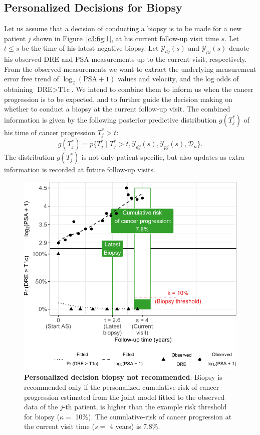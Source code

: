 \subsection{Personalized Decisions for Biopsy}
\label{c3:subsec:pers_decision_making}
Let us assume that a decision of conducting a biopsy is to be made for a new patient $j$ shown in Figure~\ref{c3:fig:1}, at his current follow-up visit time $s$. Let $t\leq s$ be the time of his latest negative biopsy. Let $\mathcal{Y}_{dj}(s)$ and $\mathcal{Y}_{pj}(s)$ denote his observed DRE and PSA measurements up to the current visit, respectively. From the observed measurements we want to extract the underlying measurement error free trend of $\log_2 (\mbox{PSA} + 1)$ values and velocity, and the log odds of obtaining $\mbox{DRE} > \mbox{T1c}$. We intend to combine them to inform us when the cancer progression is to be expected, and to further guide the decision making on whether to conduct a biopsy at the current follow-up visit. The combined information is given by the following posterior predictive distribution $g(T^*_j)$ of his time of cancer progression $T^*_j > t$:
\begin{equation}
\label{c3:eq:post_pred_dist}
g(T^*_j) = p\big\{T^*_j \mid T^*_j > t, \mathcal{Y}_{dj}(s), \mathcal{Y}_{pj}(s), \mathcal{D}_n\big\}.
\end{equation}
The distribution $g(T^*_j)$ is not only patient-specific, but also updates as extra information is recorded at future follow-up visits.

\begin{figure}
\includegraphics{contents/c3/images/c3_fig4a.pdf}
\caption{\textbf{Personalized decision biopsy not recommended}: Biopsy is recommended only if the personalized cumulative-risk of cancer progression estimated from the joint model fitted to the observed data of the $j$-th patient, is higher than the example risk threshold for biopsy ($\kappa=$ 10\%). The cumulative-risk of cancer progression at the current visit time ($s=$ 4 years) is 7.8\%.}
\label{c3:fig:4a}
\end{figure}

